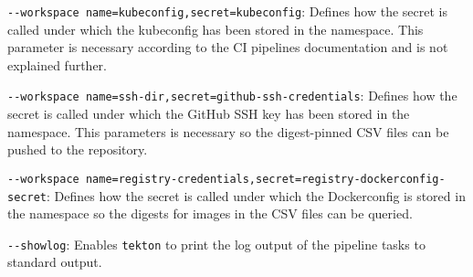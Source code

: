 \verb|--workspace name=kubeconfig,secret=kubeconfig|: Defines how the secret is called under which the kubeconfig has been stored in the namespace.
This parameter is necessary according to the CI pipelines documentation and is not explained further.

\verb|--workspace name=ssh-dir,secret=github-ssh-credentials|: Defines how the secret is called under which the GitHub SSH key has been stored in the namespace.
This parameters is necessary so the digest-pinned CSV files can be pushed to the repository.

\verb|--workspace name=registry-credentials,secret=registry-dockerconfig-secret|: Defines how the secret is called under which the Dockerconfig is stored in the namespace so the digests for images in the CSV files can be queried.

\verb|--showlog|: Enables \verb|tekton| to print the log output of the pipeline tasks to standard output.
